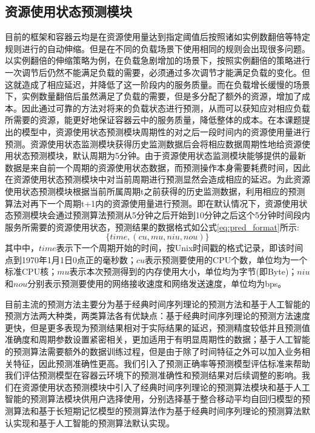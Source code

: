 \subsection{资源使用状态预测模块}\label{sec:prediction}
目前的框架和容器云均是在资源使用量达到指定阈值后按照诸如实例数翻倍等特定规则进行的自动伸缩。但是在不同的负载场景下使用相同的规则会出现很多问题。以实例翻倍的伸缩策略为例，在负载急剧增加的场景下，按照实例翻倍的策略进行一次调节后仍然不能满足负载的需要，必须通过多次调节才能满足负载的变化。但这就造成了相应延迟，并降低了这一阶段内的服务质量。而在负载增长缓慢的场景下，实例数量翻倍后虽然满足了负载的需要，但是多分配了额外的资源，增加了成本。因此通过可靠的方法对将来的负载状态进行预测，从而可以获知应对相应负载所需要的资源，能更好地保证容器云中的服务质量，降低整体的成本。在本课题提出的模型中，资源使用状态预测模块周期性的对之后一段时间内的资源使用量进行预测。资源使用状态监测模块获得历史监测数据后会将相应数据周期性地给资源使用状态预测模块，默认周期为5分钟。由于资源使用状态监测模块能够提供的最新数据是来自前一个周期的资源使用状态数据，而预测操作本身需要耗费时间，因此在资源使用状态预测模块中对当前周期进行预测显然会造成相应的延迟。为此资源使用状态预测模块根据当前所属周期t之前获得的历史监测数据，利用相应的预测算法对再下一个周期t+1内的资源使用量进行预测。即在默认情况下，资源使用状态预测模块会通过预测算法预测从5分钟之后开始到10分钟之后这个5分钟时间段内服务所需要的资源使用状态，预测结果的数据格式如公式\ref{eq:pred_format}所示:
\begin{equation}\label{eq:pred_format}
\{time, (cu, mu, niu, nou)\}
\end{equation}
其中中，$time$表示下一个周期开始的时间，按Unix时间戳的格式记录，即该时间点到1970年1月1日0点正的毫秒数；$cu$表示预测要使用的CPU个数，单位均为一个标准CPU核；$mu$表示本次预测得到的内存使用大小，单位均为字节(即Byte)；$niu$和$nou$分别表示预测要使用的网络接收速度和网络发送速度，单位均为bps。

目前主流的预测方法主要分为基于经典时间序列理论的预测方法和基于人工智能的预测方法两大种类，两类算法各有优缺点：基于经典时间序列理论的预测方法速度更快，但是更多表现为预测结果相对于实际结果的延迟，预测精度较低并且预测值准确度和周期参数设置紧密相关，更加适用于有明显周期性的数据；基于人工智能的预测算法需要额外的数据训练过程，但是由于除了时间特征之外可以加入业务相关特征，因此预测准确性更高。我们引入了预测正确率等预测模型评估标准来帮助我们评估预测模型在容器云环境下的预测准确性和预测结果对后续调整的影响。我们在资源使用状态预测模块中引入了经典时间序列理论的预测算法模块和基于人工智能的预测算法模块供用户选择使用，分别选择基于整合移动平均自回归模型的预测算法和基于长短期记忆模型\cite{hochreiter1997long}的预测算法作为基于经典时间序列理论的预测算法默认实现和基于人工智能的预测算法默认实现。

